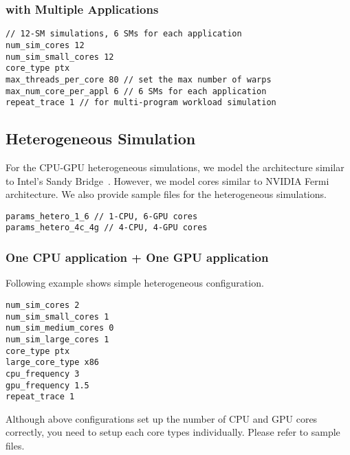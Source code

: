 \subsubsection{\gpu with Multiple Applications}

\begin{Verbatim}
// 12-SM simulations, 6 SMs for each application
num_sim_cores 12
num_sim_small_cores 12
core_type ptx
max_threads_per_core 80 // set the max number of warps 
max_num_core_per_appl 6 // 6 SMs for each application
repeat_trace 1 // for multi-program workload simulation
\end{Verbatim}


\subsection{Heterogeneous Simulation}

For the CPU-GPU heterogeneous simulations, we model the architecture
similar to Intel's Sandy Bridge~\cite{sandybridge}. However, we
model \gpu cores similar to NVIDIA Fermi~\cite{fermi} architecture. We
also provide sample files for the heterogeneous simulations.

\begin{Verbatim}
params_hetero_1_6 // 1-CPU, 6-GPU cores
params_hetero_4c_4g // 4-CPU, 4-GPU cores
\end{Verbatim}


\subsubsection{One CPU application + One GPU application}

Following example shows simple heterogeneous configuration.

\begin{Verbatim}
num_sim_cores 2
num_sim_small_cores 1
num_sim_medium_cores 0
num_sim_large_cores 1
core_type ptx
large_core_type x86
cpu_frequency 3
gpu_frequency 1.5
repeat_trace 1
\end{Verbatim}


Although above configurations set up the number of CPU and GPU cores
correctly, you need to setup each core types individually. Please
refer to sample files.

